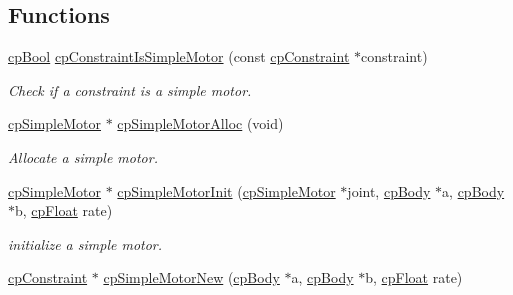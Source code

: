 \subsection*{Functions}
\begin{DoxyCompactItemize}
\item 
\hypertarget{group__cp_simple_motor_gac2da80bc913606d4c84d297e8d771a27}{}\hyperlink{group__basic_types_gabc5e752c48f3449ca26ef413ecbd647e}{cp\+Bool} \hyperlink{group__cp_simple_motor_gac2da80bc913606d4c84d297e8d771a27}{cp\+Constraint\+Is\+Simple\+Motor} (const \hyperlink{structcp_constraint}{cp\+Constraint} $\ast$constraint)\label{group__cp_simple_motor_gac2da80bc913606d4c84d297e8d771a27}

\begin{DoxyCompactList}\small\item\em Check if a constraint is a simple motor. \end{DoxyCompactList}\item 
\hypertarget{group__cp_simple_motor_ga4b97807c9c82377912fc7f40745c949c}{}\hyperlink{structcp_simple_motor}{cp\+Simple\+Motor} $\ast$ \hyperlink{group__cp_simple_motor_ga4b97807c9c82377912fc7f40745c949c}{cp\+Simple\+Motor\+Alloc} (void)\label{group__cp_simple_motor_ga4b97807c9c82377912fc7f40745c949c}

\begin{DoxyCompactList}\small\item\em Allocate a simple motor. \end{DoxyCompactList}\item 
\hypertarget{group__cp_simple_motor_ga46771f0e76cc15df8b9f9832ddd0b1d5}{}\hyperlink{structcp_simple_motor}{cp\+Simple\+Motor} $\ast$ \hyperlink{group__cp_simple_motor_ga46771f0e76cc15df8b9f9832ddd0b1d5}{cp\+Simple\+Motor\+Init} (\hyperlink{structcp_simple_motor}{cp\+Simple\+Motor} $\ast$joint, \hyperlink{structcp_body}{cp\+Body} $\ast$a, \hyperlink{structcp_body}{cp\+Body} $\ast$b, \hyperlink{group__basic_types_gac1ed65573e035bf892505768c852d8d3}{cp\+Float} rate)\label{group__cp_simple_motor_ga46771f0e76cc15df8b9f9832ddd0b1d5}

\begin{DoxyCompactList}\small\item\em initialize a simple motor. \end{DoxyCompactList}\item 
\hypertarget{group__cp_simple_motor_ga66c3053590bd2166ed3ddb6e08fe1bf5}{}\hyperlink{structcp_constraint}{cp\+Constraint} $\ast$ \hyperlink{group__cp_simple_motor_ga66c3053590bd2166ed3ddb6e08fe1bf5}{cp\+Simple\+Motor\+New} (\hyperlink{structcp_body}{cp\+Body} $\ast$a, \hyperlink{structcp_body}{cp\+Body} $\ast$b, \hyperlink{group__basic_types_gac1ed65573e035bf892505768c852d8d3}{cp\+Float} rate)\label{group__cp_simple_motor_ga66c3053590bd2166ed3ddb6e08fe1bf5}


\end{DoxyCompactItemize}
